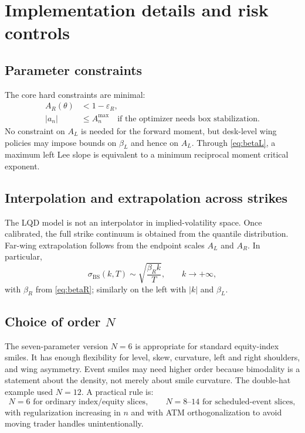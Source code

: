 \documentclass[11pt]{article}
\newcommand{\1}{\mathbf{1}}
\newcommand{\eps}{\varepsilon}
\begin{document}
\section{Implementation details and risk controls}

\subsection{Parameter constraints}

The core hard constraints are minimal:
\begin{align}
    A_R(\theta)&<1-\eps_R,\label{eq:hard1}\\
    |a_n|&\le A_n^{\max}\quad\text{if the optimizer needs box stabilization.}\label{eq:hard2}
\end{align}
No constraint on $A_L$ is needed for the forward moment, but desk-level wing policies may impose bounds on $\beta_L$ and hence on $A_L$.  Through \eqref{eq:betaL}, a maximum left Lee slope is equivalent to a minimum reciprocal moment critical exponent.

\subsection{Interpolation and extrapolation across strikes}

The LQD model is not an interpolator in implied-volatility space.  Once calibrated, the full strike continuum is obtained from the quantile distribution.  Far-wing extrapolation follows from the endpoint scales $A_L$ and $A_R$.  In particular,
\begin{equation}
    \sigma_{\mathrm{BS}}(k,T)\sim\sqrt{\frac{\beta_R k}{T}},\qquad k\to+\infty,
\end{equation}
with $\beta_R$ from \eqref{eq:betaR}; similarly on the left with $|k|$ and $\beta_L$.

\subsection{Choice of order $N$}

The seven-parameter version $N=6$ is appropriate for standard equity-index smiles.  It has enough flexibility for level, skew, curvature, left and right shoulders, and wing asymmetry.  Event smiles may need higher order because bimodality is a statement about the density, not merely about smile curvature.  The double-hat example used $N=12$.  A practical rule is:
\begin{equation}
    N=6\text{ for ordinary index/equity slices},
    \qquad N=8\text{--}14\text{ for scheduled-event slices},
\end{equation}
with regularization increasing in $n$ and with ATM orthogonalization to avoid moving trader handles unintentionally.
\end{document}
